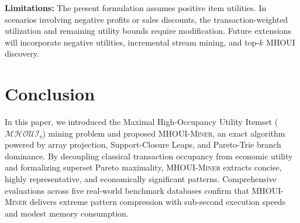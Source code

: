 \documentclass[runningheads]{llncs}
\newcommand{\MHOUI}{\ensuremath{\mathcal{MHOUI}_{\mathrm{s}}}}
\newcommand{\MHOUIminer}{\textsc{MHOUI-Miner}}
\begin{document}
\noindent
\textbf{Limitations:} The present formulation assumes positive item utilities. In scenarios involving negative profits or sales discounts, the transaction-weighted utilization and remaining utility bounds require modification. Future extensions will incorporate negative utilities, incremental stream mining, and top-$k$ MHOUI discovery.

\section{Conclusion}
\label{sec:conclusion}

In this paper, we introduced the Maximal High-Occupancy Utility Itemset (\MHOUI{}) mining problem and proposed \MHOUIminer{}, an exact algorithm powered by array projection, Support-Closure Leaps, and Pareto-Trie branch dominance. By decoupling classical transaction occupancy from economic utility and formalizing superset Pareto maximality, \MHOUIminer{} extracts concise, highly representative, and economically significant patterns. Comprehensive evaluations across five real-world benchmark databases confirm that \MHOUIminer{} delivers extreme pattern compression with sub-second execution speeds and modest memory consumption.



\end{document}
